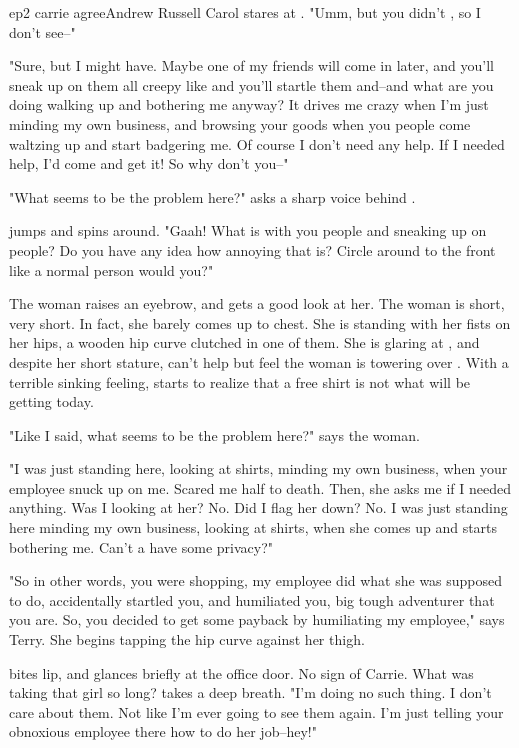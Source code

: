 \documentclass{book}
\begin{document}
\begin{childnode}{ep2 carrie agree}{Andrew Russell}
    Carol stares at \name{}. "Umm, but you didn't \sirmaam{}, so I don't see--"

    "Sure, but I might have. Maybe one of my friends will come in later, and you'll sneak up on them all creepy like and you'll startle them and--and what are you doing walking up and bothering me
    anyway? It drives me crazy when I'm just minding my own business, and browsing your goods when you people come waltzing up and start badgering me. Of course I don't need any help. If I needed
    help, I'd come and get it! So why don't you--"

    "What seems to be the problem here?" asks a sharp voice behind \name{}.

    \name{} jumps and spins around. "Gaah! What is with you people and sneaking up on people? Do you have any idea how annoying that is? Circle around to the front like a normal person would you?"

    The woman raises an eyebrow, and \name{} gets a good look at her. The woman is short, 
    {very short. In fact, she barely comes up to \names{} chest.} She is standing with her fists on her hips, a wooden hip curve clutched in one of them. She is glaring at \name{}, and despite her
    short stature, \name{} can't help but feel the woman is towering over \himher{}. With a terrible sinking feeling, \name{} starts to realize that a free shirt is not what \heshe{} will be getting
    today.

    "Like I said, what seems to be the problem here?" says the woman.

    "I was just standing here, looking at shirts, minding my own business, when your employee snuck up on me. Scared me half to death. Then, she asks me if I needed anything. Was I looking
    at her? No. Did I flag her down? No. I was just standing here minding my own business, looking at shirts, when she comes up and starts bothering me. Can't a \manwoman{} have some privacy?"

    "So in other words, you were shopping, my employee did what she was supposed to do, accidentally startled you, and humiliated you, big tough adventurer that you are. So, you decided to get
    some payback by humiliating my employee," says Terry. She begins tapping the hip curve against her thigh.

    \name{} bites \hisher{} lip, and glances briefly at the office door. No sign of Carrie. What was taking that girl so long? \HeShe{} takes a deep breath. "I'm doing no such thing. I don't 
    care about them. Not like I'm ever going to see them again. I'm just telling your obnoxious employee there how to do her job--hey!"


\end{childnode}
\end{document}
